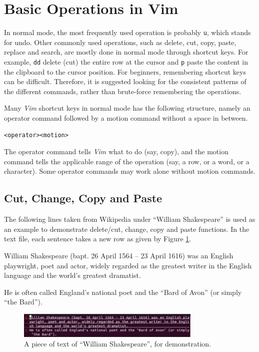 \section{Basic Operations in Vim}

In normal mode, the most frequently used operation is probably \verb|u|, which stands for undo. Other commonly used operations, such as delete, cut, copy, paste, replace and search, are mostly done in normal mode through shortcut keys. For example, \verb|dd| delete (cut) the entire row at the cursor and \verb|p| paste the content in the clipboard to the cursor position. For beginners, remembering shortcut keys can be difficult. Therefore, it is suggested looking for the consistent patterns of the different commands, rather than brute-force remembering the operations.

Many \textit{Vim} shortcut keys in normal mode has the following structure, namely an operator command followed by a motion command without a space in between.
\begin{lstlisting}
<operator><motion>
\end{lstlisting}
The operator command tells \textit{Vim} what to do (say, copy), and the motion command tells the applicable range of the operation (say, a row, or a word, or a character). Some operator commands may work alone without motion commands.

\subsection{Cut, Change, Copy and Paste}

The following lines taken from Wikipedia under ``William Shakespeare'' is used as an example to demonstrate delete/cut, change, copy and paste functions. In the text file, each sentence takes a new row as given by Figure \ref{ch:tfe:fig:vimdemo1}.

\begin{shortbox}
William Shakespeare (bapt. 26 April 1564 – 23 April 1616) was an English playwright, poet and actor, widely regarded as the greatest writer in the English language and the world's greatest dramatist.

He is often called England's national poet and the ``Bard of Avon'' (or simply ``the Bard'').
\end{shortbox}

\begin{figure}
\centering
\includegraphics[width=250pt]{chapters/ch-text-file-editing/figures/vimdemo1.png}
\caption{A piece of text of ``William Shakespeare'', for demonstration.} \label{ch:tfe:fig:vimdemo1}
\end{figure}

